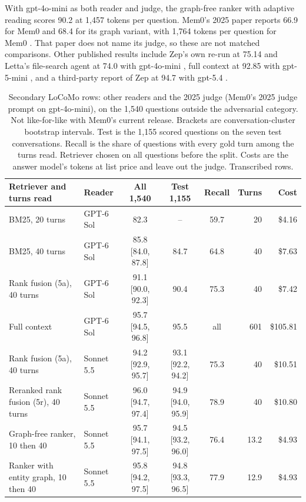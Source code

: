With gpt-4o-mini as both reader and judge, the graph-free ranker with adaptive reading scores 90.2 at 1,457 tokens per question. Mem0's 2025 paper reports 66.9 for Mem0 and 68.4 for its graph variant, with 1,764 tokens per question for Mem0 \citep{chhikara2025mem0}. That paper does not name its judge, so these are not matched comparisons. Other published results include Zep's own re-run at 75.14 and Letta's file-search agent at 74.0 with gpt-4o-mini \citep{letta2025benchmarking,zep2025rebuttal}, full context at 92.85 with gpt-5-mini \citep{fullcontext2026}, and a third-party report of Zep at 94.7 with gpt-5.4 \citep{coretoday2026audit}.

\begin{table}[p]
\caption{Secondary LoCoMo rows: other readers and the 2025 judge (Mem0's 2025 judge prompt on gpt-4o-mini), on the 1,540 questions outside the adversarial category. Not like-for-like with Mem0's current release. Brackets are conversation-cluster bootstrap intervals. Test is the 1,155 scored questions on the seven test conversations. Recall is the share of questions with every gold turn among the turns read. \tun{} Retriever chosen on all questions before the split. Costs are the answer model's tokens at list price and leave out the judge. \pub{} Transcribed rows.}
\label{tab:locomo}
\small
\centering
\setlength{\tabcolsep}{4pt}
\begin{tabular}{@{}L{50mm}L{22mm}cccrr@{}}
\toprule
Retriever and turns read & Reader & All 1,540 & Test 1,155 & Recall & Turns & Cost \\
\midrule
BM25, 20 turns & GPT-6 Sol & 82.3 & -- & 59.7 & 20 & \$4.16 \\
BM25, 40 turns & GPT-6 Sol & 85.8 [84.0, 87.8] & 84.7 & 64.8 & 40 & \$7.63 \\
Rank fusion (5a), 40 turns\tun{} & GPT-6 Sol & 91.1 [90.0, 92.3] & 90.4 & 75.3 & 40 & \$7.42 \\
Full context & GPT-6 Sol & 95.7 [94.5, 96.8] & 95.5 & all & 601 & \$105.81 \\
Rank fusion (5a), 40 turns\tun{} & Sonnet 5.5 & 94.2 [92.9, 95.7] & 93.1 [92.2, 94.2] & 75.3 & 40 & \$10.51 \\
Reranked rank fusion (5r), 40 turns & Sonnet 5.5 & 96.0 [94.7, 97.4] & 94.9 [94.0, 95.9] & 78.9 & 40 & \$10.80 \\
Graph-free ranker, 10 then 40 & Sonnet 5.5 & 95.7 [94.1, 97.5] & 94.5 [93.2, 96.0] & 76.4 & 13.2 & \$4.93 \\
Ranker with entity graph, 10 then 40 & Sonnet 5.5 & 95.8 [94.2, 97.5] & 94.8 [93.3, 96.5] & 77.9 & 12.9 & \$4.93 \\

\end{tabular}
\end{table}
